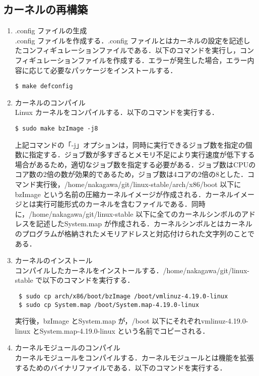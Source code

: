 \documentclass[12pt]{jsarticle}
\begin{document}
\subsection{カーネルの再構築}\label{sec:saikoutiku}
  \begin{enumerate}
  \item .config ファイルの生成\\
    .config ファイルを作成する．.config ファイルとはカーネルの設定を記述したコンフィギュレーションファイルである．以下のコマンドを実行し，コンフィギュレーションファイルを作成する．エラーが発生した場合，エラー内容に応じて必要なパッケージをインストールする．
\begin{verbatim}
$ make defconfig
\end{verbatim}
\item カーネルのコンパイル\\
  Linux カーネルをコンパイルする．以下のコマンドを実行する．
\begin{verbatim}
$ sudo make bzImage -j8
\end{verbatim}
上記コマンドの「-j」オプションは，同時に実行できるジョブ数を指定の個数に指定する．ジョブ数が多すぎるとメモリ不足により実行速度が低下する場合があるため，適切なジョブ数を指定する必要がある．ジョブ数はCPUのコア数の2倍の数が効果的であるため，ジョブ数は4コアの2倍の8とした．コマンド実行後，/home/nakagawa/git/linux-stable/arch/x86/boot 以下にbzImage という名前の圧縮カーネルイメージが作成される．カーネルイメージとは実行可能形式のカーネルを含むファイルである．同時に，/home/nakagawa/git/linux-stable 以下に全てのカーネルシンボルのアドレスを記述したSystem.map が作成される．カーネルシンボルとはカーネルのプログラムが格納されたメモリアドレスと対応付けられた文字列のことである．
\item カーネルのインストール\\
  コンパイルしたカーネルをインストールする．/home/nakagawa/git/linux-stable で以下のコマンドを実行する．
\begin{verbatim}
 $ sudo cp arch/x86/boot/bzImage /boot/vmlinuz-4.19.0-linux
 $ sudo cp System.map /boot/System.map-4.19.0-linux
\end{verbatim}
実行後，bzImage とSystem.map が，/boot 以下にそれぞれvmlinuz-4.19.0-linux とSystem.map-4.19.0-linux という名前でコピーされる．
\item カーネルモジュールのコンパイル\\
  カーネルモジュールをコンパイルする．カーネルモジュールとは機能を拡張するためのバイナリファイルである．以下のコマンドを実行する．
\begin{verbatim}

\end{verbatim}
\end{enumerate}
\end{document}
